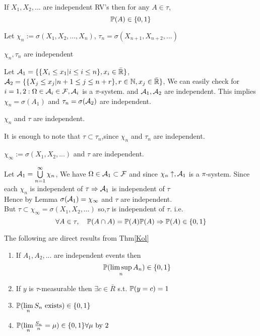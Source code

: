 \newpage
\begin{thm}\label{Kol} If $X_1, X_2, ...$ are independent RV's then for any $A \in \tau$, 
\begin{equation*}
    \mathbb{P}(A) \in \{0,1\}
\end{equation*}
\end{thm}
\pf Let $\chi_n :=\sigma(X_1, X_2, ...,X_n)$, $\tau_n = \sigma(X_{n+1}, X_{n+2}, ...)$
\begin{lem}
$\chi_n, \tau_n$ are independent
\end{lem}
\pf Let $\mathcal{A}_1 = \{\{X_i \leq x_1| i\leq i\leq n\}, x_i \in \bar{\mathbb{R}}\}$, $\mathcal{A}_2 = \{\{X_j \leq x_j| n+1\leq j\leq n+r\}, r\in \mathbb{N},x_j \in \bar{\mathbb{R}}\}$, We can easily check for $i = 1,2: \Omega \in \mathcal{A}_i \in \mathcal{F}, \mathcal{A}_i$ is a $\pi$-system. and $\mathcal{A}_1,\mathcal{A}_2$ are independent. This implies $\chi_n = \sigma(A_1)$ and $\tau_n = \sigma(\mathcal{A}_2)$ are independent. 
\begin{lem}
$\chi_n$ and $\tau$ are independent.
\end{lem}
\pf It is enough to note that $\tau \subset \tau_n$,since $\chi_n$ and $\tau_n$ are independent.
\begin{lem}
$\chi_\infty := \sigma(X_1, X_2, ...)$ and $\tau$ are independent.
\end{lem}
\pf Let $\mathcal{A}_1 = \bigcup\limits_{n=1}^\infty \chi_n$, We have $\Omega \in \mathcal{A}_1 \subset \mathcal{F}$ and since $\chi_n\uparrow, \mathcal{A}_1$ is a $\pi$-system. Since each $\chi_n$ is independent of $\tau \Rightarrow \mathcal{A}_1$ is independent of $\tau$ \\
Hence by Lemma $\sigma(\mathcal{A}_1) = \chi_\infty$ and $\tau$ are independent. \\
But $\tau \subset \chi_\infty = \sigma(X_1, X_2, ...)$ so,$\tau$ is independent of $\tau$. i.e.
\begin{equation*}
    \forall A\in \tau, \quad \mathbb{P}(A \cap A) = \mathbb{P}(A)\mathbb{P}(A) \Rightarrow \mathbb{P}(A) \in \{0,1\}
\end{equation*}
\begin{cor} The following are direct results from Thm\ref{Kol}
\begin{enumerate}
    \item If $A_1, A_2, ...$ are independent events then
    \begin{equation*}
        \mathbb{P}(\limsup\limits_{n}A_n)\in \{0,1\}
    \end{equation*}
    \item If $y$ is $\tau$-measurable then $\exists c\in \bar{R}$ s.t. $\mathbb{P}(y = c) = 1$
    \item $\mathbb{P}(\lim\limits_{n}S_n \text{ exists}) \in \{0,1\}$
    \item $\mathbb{P}(\lim\limits_{n}\frac{S_n}{n} = \mu) \in \{0,1\} \forall \mu \text{ by } 2$
\end{enumerate}
\end{cor}
\pf